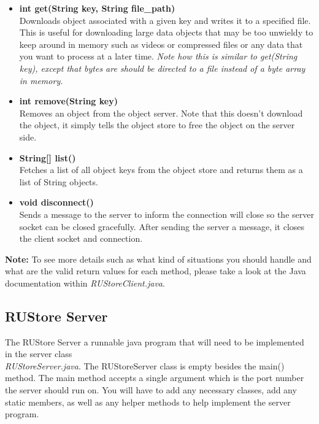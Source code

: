\documentclass{article}
\begin{document}
\begin{itemize}
    \item \textbf{int get(String key, String file\_path)} \vspace{0.1cm} \\
            Downloads object associated with a given key and writes it to a specified file. This is useful for downloading large data objects that may be too unwieldy to keep around in memory such as videos or compressed files or any data that you want to process at a later time. \textit{Note how this is similar to get(String key), except that bytes are should be directed to a file instead of a byte array in memory.}
    \item \textbf{int remove(String key)} \vspace{0.1cm} \\
            Removes an object from the object server. Note that this doesn't download the object, it simply tells the object store to free the object on the server side. 
    \item \textbf{String[] list()} \vspace{0.1cm} \\
            Fetches a list of all object keys from the object store and returns them as a list of String objects.
    \item \textbf{void disconnect()} \vspace{0.1cm} \\
            Sends a message to the server to inform the connection will close so the server socket can be closed gracefully. After sending the server a message, it closes the client socket and connection. 
            
\end{itemize}

\noindent \textbf{Note:} To see more details such as what kind of situations you should handle and what are the valid return values for each method, please take a look at the Java documentation within \textit{RUStoreClient.java}.

\subsection*{RUStore Server}
The RUStore Server a runnable java program that will need to be implemented in the server class\\ \textit{RUStoreServer.java}. The RUStoreServer class is empty besides the main() method. The main method accepts a single argument which is the port number the server should run on. You will have to add any necessary classes, add any static members, as well as any helper methods to help implement the server program. 
\end{document}
